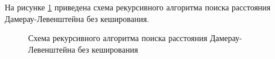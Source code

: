 
На рисунке \ref{fig:dleven_rec1} приведена схема рекурсивного алгоритма поиска расстояния Дамерау-Левенштейна без кеширования.

\begin{figure}[h!]
	
		
	\caption{Схема рекурсивного алгоритма поиска расстояния Дамерау-Левенштейна без кеширования}
		
	\label{fig:dleven_rec1}
		
\end{figure}

